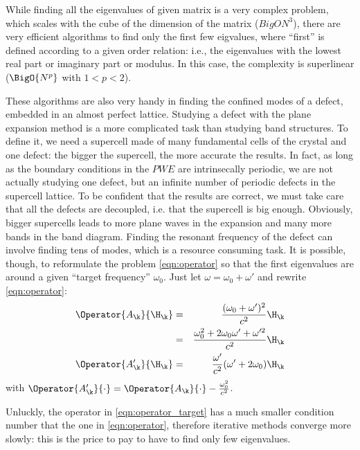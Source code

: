 While finding all the eigenvalues of given matrix is a very complex
problem, which scales with the cube of the dimension of the matrix
($BigO{N^3}$), there are very efficient algorithms to find only the
first few eigvalues, where ``first'' is defined according to a given
order relation: i.e., the eigenvalues with the lowest real part or
imaginary part or modulus. In this case, the complexity is
superlinear ($\BigO{N^p}$ with $1 < p < 2$).

These algorithms are also very handy in finding the confined modes of
a defect, embedded in an almost perfect lattice. Studying a defect
with the plane expansion method is a more complicated task than
studying band structures. To define it, we need a supercell made of
many fundamental cells of the crystal and one defect: the bigger the
supercell, the more accurate the results. In fact, as long as the
boundary conditions in the $PWE$ are intrinsecally periodic, we are
not actually studying one defect, but an infinite number of periodic
defects in the supercell lattice. To be confident that the results are
correct, we must take care that all the defects are decoupled,
i.e. that the supercell is big enough. Obviously, bigger supercells
leads to more plane waves in the expansion and many more bands in the
band diagram. Finding the resonant frequency of the defect can involve
finding tens of modes, which is a resource consuming task. It is
possible, though, to reformulate the problem \ref{eqn:operator} so
that the first eigenvalues are around a given ``target frequency''
$\omega_0$. Just let $\omega = \omega_0 + \omega'$ and rewrite
\ref{eqn:operator}:
\begin{eqnarray} \label{eqn:operator_target}
  \Operator{A_{\k}}{\H_{\k}} & = & \frac{(\omega_0 + \omega')^2}{c^2}
  \H_{\k} \nonumber \\
  & = & \frac{\omega_0^2 + 2 \omega_0 \omega' +
  \omega'^2}{c^2} \H_{\k} \nonumber \\
  \Operator{A'_{\k}}{\H_{\k}} & = & \frac{\omega'}{c^2}(\omega' + 2 \omega_0)
  \H_{\k}
\end{eqnarray}
with $\Operator{A'_{\k}}{\cdot} = \Operator{A_{\k}}{\cdot} -
\frac{\omega_0^2}{c^2}$.

Unluckly, the operator in \ref{eqn:operator_target} has a much smaller
condition number that the one in \ref{eqn:operator}, therefore
iterative methods converge more slowly: this is the price to pay to
have to find only few eigenvalues.

\subsection{\cite{lalanne_effective}}

